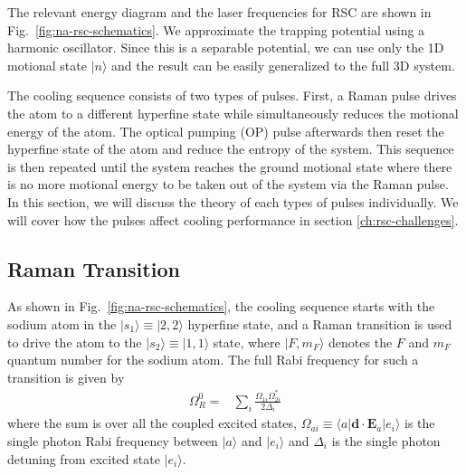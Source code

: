The relevant energy diagram and the laser frequencies for RSC are shown in
Fig.~\ref{fig:na-rsc-schematics}.
We approximate the trapping potential using a harmonic oscillator.
Since this is a separable potential, we can use only the 1D motional state $|n\rangle$
and the result can be easily generalized to the full 3D system.

The cooling sequence consists of two types of pulses.
First, a Raman pulse drives the atom to a different hyperfine state while simultaneously
reduces the motional energy of the atom.
The optical pumping (OP) pulse afterwards then reset the hyperfine state of the atom
and reduce the entropy of the system.
This sequence is then repeated until the system reaches the ground motional state
where there is no more motional energy to be taken out of the system via the Raman pulse.
In this section, we will discuss the theory of each types of pulses individually.
We will cover how the pulses affect cooling performance in section \ref{ch:rsc-challenges}.

\subsection{Raman Transition}
\label{ch:rsc-basic-theory-raman}

As shown in Fig.~\ref{fig:na-rsc-schematics},
the cooling sequence starts with the sodium atom in the
$|s_1\rangle\equiv|2,2\rangle$ hyperfine state,
and a Raman transition is used to drive the atom to the $|s_2\rangle\equiv|1,1\rangle$ state,
where $|F,m_F\rangle$ denotes the $F$ and $m_F$ quantum number for the sodium atom.
The full Rabi frequency for such a transition is given by
\begin{align}
  \Omega_R^0=&\sum_{i}\frac{\Omega_{1i}\Omega_{2i}^*}{2\Delta_i}\label{rsc-basic-theory-raman-rabi}
\end{align}
where the sum is over all the coupled excited states,
$\Omega_{ai}\equiv\langle a|\mathbf{d}\cdot\mathbf{E}_a|e_i\rangle$ is the single photon
Rabi frequency between $|a\rangle$ and $|e_i\rangle$
and $\Delta_i$ is the single photon detuning from excited state $|e_i\rangle$.

